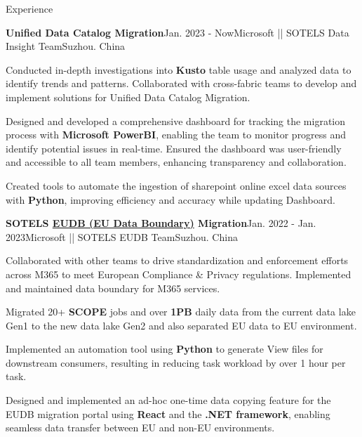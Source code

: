 \documentclass[a4paper]{resume} %
\begin{document}
\begin{rSection}{\large Experience}

\begin{rSubsection}{\textbf{\large{Unified Data Catalog Migration}}}{Jan. 2023 - Now}{Microsoft || SOTELS Data Insight Team}{Suzhou. China}

\item Conducted in-depth investigations into \textbf{Kusto} table usage and analyzed data to identify trends and patterns. Collaborated with cross-fabric teams to develop and implement solutions for Unified Data Catalog Migration.
\item Designed and developed a comprehensive dashboard for tracking the migration process with \textbf{Microsoft PowerBI}, enabling the team to monitor progress and identify potential issues in real-time. Ensured the dashboard was user-friendly and accessible to all team members, enhancing transparency and collaboration.
\item Created tools to automate the ingestion of sharepoint online excel data sources with \textbf{Python}, improving efficiency and accuracy while updating Dashboard.

\end{rSubsection}

\begin{rSubsection}{\textbf{\large{SOTELS {\href{https://www.microsoft.com/en-us/trust-center/privacy/european-data-boundary-eudb}{EUDB (EU Data Boundary)}} Migration}}}{Jan. 2022 - Jan. 2023}{Microsoft || SOTELS EUDB Team}{Suzhou. China}

\item Collaborated with other teams to drive standardization and enforcement efforts across M365 to meet European Compliance \& Privacy regulations. Implemented and maintained data boundary for M365 services.
\item Migrated 20+ \textbf{SCOPE} jobs and over \textbf{1PB} daily data from the current data lake Gen1 to the new data lake Gen2 and also separated EU data to EU environment.
\item Implemented an automation tool using \textbf{Python} to generate View files for downstream consumers, resulting in reducing task workload by over 1 hour per task.
\item Designed and implemented an ad-hoc one-time data copying feature for the EUDB migration portal using \textbf{React} and the \textbf{.NET framework}, enabling seamless data transfer between EU and non-EU environments.


\end{rSubsection}
\end{rSection}
\end{document}
